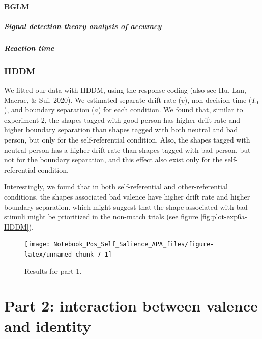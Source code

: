 \documentclass[
  english,
  man]{apa6}
\let\oldparagraph\paragraph
\renewcommand{\paragraph}[1]{\oldparagraph{#1}\mbox{}}
\let\oldsubparagraph\subparagraph
\renewcommand{\subparagraph}[1]{\oldsubparagraph{#1}\mbox{}}
\begin{document}
\hypertarget{bglm-1}{%
\paragraph{BGLM}\label{bglm-1}}

\hypertarget{signal-detection-theory-analysis-of-accuracy-3}{%
\subparagraph{Signal detection theory analysis of accuracy}\label{signal-detection-theory-analysis-of-accuracy-3}}

\hypertarget{reaction-time-3}{%
\subparagraph{Reaction time}\label{reaction-time-3}}

\hypertarget{hddm-4}{%
\subsubsection{HDDM}\label{hddm-4}}

We fitted our data with HDDM, using the response-coding (also see Hu, Lan, Macrae, \& Sui, 2020). We estimated separate drift rate (\(v\)), non-decision time (\(T_{0}\)), and boundary separation (\(a\)) for each condition. We found that, similar to experiment 2, the shapes tagged with good person has higher drift rate and higher boundary separation than shapes tagged with both neutral and bad person, but only for the self-referential condition. Also, the shapes tagged with neutral person has a higher drift rate than shapes tagged with bad person, but not for the boundary separation, and this effect also exist only for the self-referential condition.

Interestingly, we found that in both self-referential and other-referential conditions, the shapes associated bad valence have higher drift rate and higher boundary separation. which might suggest that the shape associated with bad stimuli might be prioritized in the non-match trials (see figure \ref{fig:plot-exp6a-HDDM}).

\begin{figure}
\texttt{[image: Notebook\_Pos\_Self\_Salience\_APA\_files/figure-latex/unnamed-chunk-7-1]} \caption{Results for part 1.}\label{fig:unnamed-chunk-7}
\end{figure}

\hypertarget{part-2-interaction-between-valence-and-identity}{%
\section{Part 2: interaction between valence and identity}\label{part-2-interaction-between-valence-and-identity}}
\end{document}
